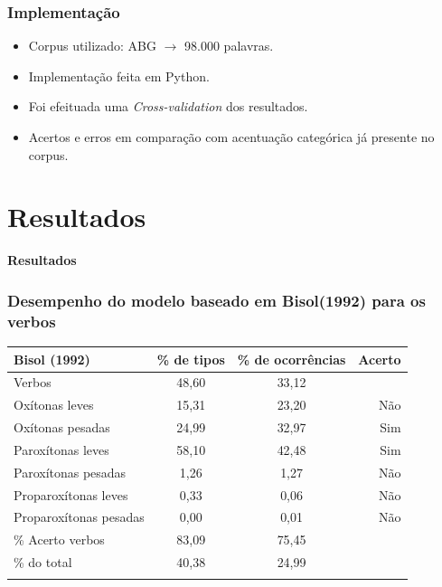 \documentclass[xcolor=table]{beamer}
\begin{document}
	\begin{frame}
		\frametitle{Implementação}
		\begin{itemize}
			\item Corpus utilizado: ABG $\rightarrow$ 98.000 palavras.\\
			\item Implementação feita em Python.\\
			\item Foi efeituada uma \textit{Cross-validation} dos resultados.\\
			\item Acertos e erros em comparação com acentuação categórica já presente no corpus.\\
		\end{itemize}
	\end{frame}

	\section{Resultados}
	\begin{frame}

		\centering \textbf{Resultados}
	\end{frame}
	
	\begin{frame}
		\frametitle{Desempenho do modelo baseado em Bisol(1992) para os verbos}
\begin{table}[H]
	\centering
	\label{TAB27}
	\begin{tabular}{@{}lccr@{}}
		\toprule
		\textbf{Bisol (1992)}          & \textbf{\% de tipos}   & \textbf{\% de ocorrências} & \textbf{Acerto} \\ \midrule
		Verbos                & 48,60       & 33,12           &        \\
		Oxítonas leves                & 15,31       & 23,20           & Não      \\
		\rowcolor[HTML]{656565} 
		Oxítonas pesadas                & 24,99       & 32,97           & Sim      \\
		\rowcolor[HTML]{656565} 
		Paroxítonas leves               & 58,10       & 42,48           & Sim      \\
		Paroxítonas pesadas               & 1,26        & 1,27            & Não      \\
		Proparoxítonas leves                & 0,33        & 0,06            & Não      \\
		Proparoxítonas pesadas                & 0,00        & 0,01            & Não      \\
		\% Acerto verbos           & 83,09       & 75,45           &        \\
		\% do total           & 40,38       & 24,99           &        \\
		&               &                   &        \\
	
	\end{tabular}
\end{table}


	\end{frame}
	
\end{document}
